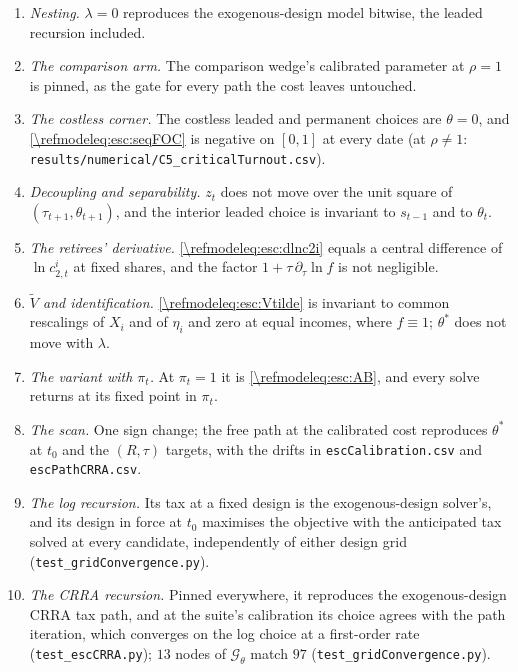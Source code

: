 \begin{enumerate}
    \item \emph{Nesting.} $\lambda=0$ reproduces the exogenous-design model bitwise, the leaded recursion included.
    \item \emph{The comparison arm.} The comparison wedge's calibrated parameter at $\rho=1$ is pinned, as the gate for every path the cost leaves untouched.
    \item \emph{The costless corner.} The costless leaded and permanent choices are $\theta=0$, and \eqref{\refmodeleq:esc:seqFOC} is negative on $[0,1]$ at every date (at $\rho\neq1$: \texttt{results/numerical/C5\_criticalTurnout.csv}).
    \item \emph{Decoupling and separability.} $z_t$ does not move over the unit square of $\left(\tau_{t+1},\theta_{t+1}\right)$, and the interior leaded choice is invariant to $s_{t-1}$ and to $\theta_t$.
    \item \emph{The retirees' derivative.} \eqref{\refmodeleq:esc:dlnc2i} equals a central difference of $\ln c_{2,t}^i$ at fixed shares, and the factor $1+\tau\,\partial_{\tau}\ln f$ is not negligible.
    \item \emph{$\tilde{V}$ and identification.} \eqref{\refmodeleq:esc:Vtilde} is invariant to common rescalings of $X_i$ and of $\eta_i$ and zero at equal incomes, where $f\equiv1$; $\theta^{\ast}$ does not move with $\lambda$.
    \item \emph{The variant with $\pi_t$.} At $\pi_t=1$ it is \eqref{\refmodeleq:esc:AB}, and every solve returns at its fixed point in $\pi_t$.
    \item \emph{The scan.} One sign change; the free path at the calibrated cost reproduces $\theta^{\ast}$ at $t_0$ and the $\left(R,\tau\right)$ targets, with the drifts in \texttt{escCalibration.csv} and \texttt{escPathCRRA.csv}.
    \item \emph{The log recursion.} Its tax at a fixed design is the exogenous-design solver's, and its design in force at $t_0$ maximises the objective with the anticipated tax solved at every candidate, independently of either design grid (\texttt{test\_gridConvergence.py}).
    \item \emph{The CRRA recursion.} Pinned everywhere, it reproduces the exogenous-design CRRA tax path, and at the suite's calibration its choice agrees with the path iteration, which converges on the log choice at a first-order rate (\texttt{test\_escCRRA.py}); $13$ nodes of $\mathcal{G}_{\theta}$ match $97$ (\texttt{test\_gridConvergence.py}).

\end{enumerate}
